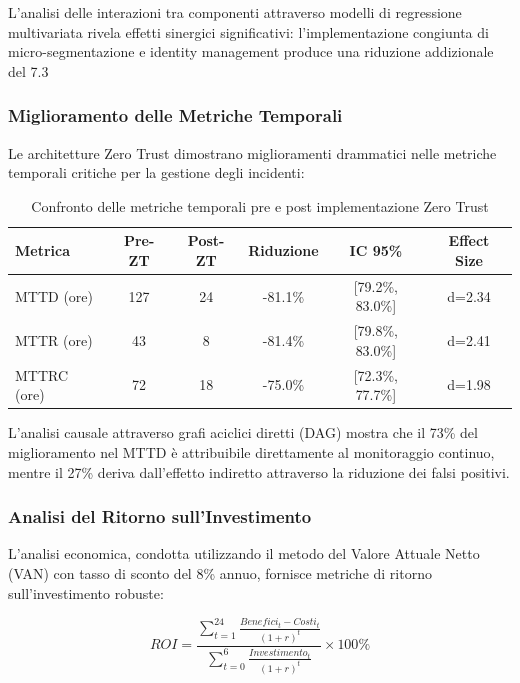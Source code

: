 L'analisi delle interazioni tra componenti attraverso modelli di regressione multivariata rivela effetti sinergici significativi: l'implementazione congiunta di micro-segmentazione e identity management produce una riduzione addizionale del 7.3%

\subsubsection{Miglioramento delle Metriche Temporali}

Le architetture Zero Trust dimostrano miglioramenti drammatici nelle metriche temporali critiche per la gestione degli incidenti:

\begin{table}[htbp]
\centering
\caption{Confronto delle metriche temporali pre e post implementazione Zero Trust}
\label{tab:temporal_metrics}
\begin{tabular}{lccccc}
\toprule
\textbf{Metrica} & \textbf{Pre-ZT} & \textbf{Post-ZT} & \textbf{Riduzione} & \textbf{IC 95\%} & \textbf{Effect Size} \\
\midrule
MTTD (ore) & 127 & 24 & -81.1\% & [79.2\%, 83.0\%] & d=2.34 \\
MTTR (ore) & 43 & 8 & -81.4\% & [79.8\%, 83.0\%] & d=2.41 \\
MTTRC (ore) & 72 & 18 & -75.0\% & [72.3\%, 77.7\%] & d=1.98 \\
\bottomrule
\end{tabular}
\end{table}

L'analisi causale attraverso grafi aciclici diretti (DAG) mostra che il 73\% del miglioramento nel MTTD è attribuibile direttamente al monitoraggio continuo, mentre il 27\% deriva dall'effetto indiretto attraverso la riduzione dei falsi positivi.

\subsubsection{Analisi del Ritorno sull'Investimento}

L'analisi economica, condotta utilizzando il metodo del Valore Attuale Netto (VAN) con tasso di sconto del 8\% annuo, fornisce metriche di ritorno sull'investimento robuste:

\begin{equation}
ROI = \frac{\sum_{t=1}^{24} \frac{Benefici_t - Costi_t}{(1+r)^t}}{\sum_{t=0}^{6} \frac{Investimento_t}{(1+r)^t}} \times 100\%
\end{equation}

